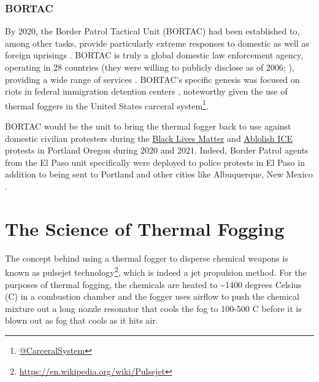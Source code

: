 \documentclass[
  12pt,
]{krantz}
\renewcommand{\href}[2]{#2\footnote{\url{#1}}}
\begin{document}
\hypertarget{bortac}{%
\subsection*{BORTAC}\label{bortac}}


By 2020, the Border Patrol Tactical Unit (BORTAC) had been established to, among other tasks, provide particularly extreme responses to domestic as well as foreign uprisings \citep{CBP2006, CBP2014, CBP2018}.
BORTAC is truly a global domestic law enforcement agency, operating in 28 countries (they were willing to publicly disclose as of 2006; \citet{CBP2006}), providing a wide range of services \citep{CBP2014, Miller2019}.
BORTAC's specific genesis was focused on riots in federal immigration detention centers \citep{CBP2006, CBP2014}, noteworthy given the use of thermal foggers in the United States \href{@CarceralSystem}{carceral system}.

BORTAC would be the unit to bring the thermal fogger back to use against domestic civilian protesters during the \protect\hyperlink{PortlandOR2020_07_29}{Black Lives Matter} and \protect\hyperlink{PortlandORICE2020_2021}{Ablolish ICE} protests in Portland Oregon during 2020 and 2021.
Indeed, Border Patrol agents from the El Paso unit specifically were deployed to police protests in El Paso in addition to being sent to Portland and other cities like Albuquerque, New Mexico \citep{Borunda2020}.

\hypertarget{the-science-of-thermal-fogging}{%
\chapter*{The Science of Thermal Fogging}\label{the-science-of-thermal-fogging}}


The concept behind using a thermal fogger to disperse chemical weapons is known as \href{https://en.wikipedia.org/wiki/Pulsejet}{pulsejet technology}, which is indeed a jet propulsion method.
For the purposes of thermal fogging, the chemicals are heated to \textasciitilde1400 degrees Celsius (C) in a combustion chamber and the fogger uses airflow to push the chemical mixture out a long nozzle resonator that cools the fog to 100-500 C before it is blown out as fog that cools as it hits air.
\end{document}
